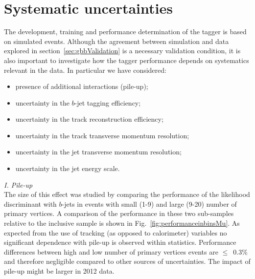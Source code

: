 \section{Systematic uncertainties}\label{sec:gbbSystematics}
The development, training and performance determination of the tagger is based on simulated events. Although the agreement between simulation and data explored in section~\ref{sec:gbbValidation} is a necessary validation condition, it is also important to investigate how the tagger performance depends on systematics relevant in the data. In particular we have considered:
%
%
\begin{itemize}\addtolength{\itemsep}{-0.4\baselineskip}
\item
presence of additional interactions (pile-up);
\item
uncertainty in the $b$-jet tagging efficiency; %
\item
uncertainty in the track reconstruction efficiency;
\item
uncertainty in the track transverse momentum resolution;
\item
uncertainty in the jet transverse momentum resolution;
\item
uncertainty in the jet energy scale.
\end{itemize}

{ \em I. Pile-up}
\\[3mm]
  The size of this effect was studied by comparing the performance of the likelihood discriminant with $b$-jets in events with small (1-9) and large (9-20) number of primary vertices. 
A comparison of the performance in these two sub-samples relative to the inclusive sample is shown in Fig.~\ref{fig:performanceinbinsMu}. 
As expected from the use of tracking (as opposed to calorimeter) variables no significant dependence with pile-up is observed within statistics. %
Performance differences between high and low number of primary vertices events are $\leq$~0.3\% and therefore negligible compared to other sources of uncertainties. The impact of pile-up might be larger in 2012 data.

